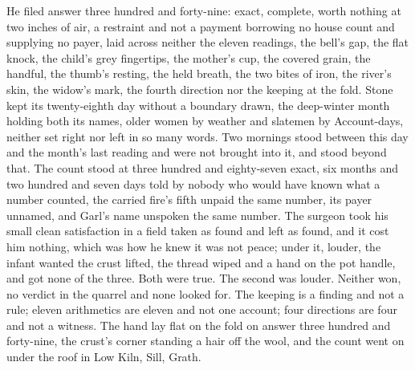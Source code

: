 He filed answer three hundred and forty-nine: exact, complete, worth nothing at two inches of air, a restraint and not a payment borrowing no house count and supplying no payer, laid across neither the eleven readings, the bell's gap, the flat knock, the child's grey fingertips, the mother's cup, the covered grain, the handful, the thumb's resting, the held breath, the two bites of iron, the river's skin, the widow's mark, the fourth direction nor the keeping at the fold. Stone kept its twenty-eighth day without a boundary drawn, the deep-winter month holding both its names, older women by weather and slatemen by  Account-days, neither set right nor left in so many words. Two mornings stood between this day and the month's last reading and were not brought into it, and  stood beyond that. The count stood at three hundred and eighty-seven exact, six months and two hundred and seven days told by nobody who would have known what a number counted, the carried fire's fifth unpaid the same number, its payer unnamed, and Garl's name unspoken the same number. The surgeon took his small clean satisfaction in a field taken as found and left as found, and it cost him nothing, which was how he knew it was not peace; under it, louder, the infant wanted the crust lifted, the thread wiped and a hand on the pot handle, and got none of the three. Both were true. The second was louder. Neither won, no verdict in the quarrel and none looked for. The keeping is a finding and not a rule; eleven arithmetics are eleven and not one account; four directions are four and not a witness. The hand lay flat on the fold on answer three hundred and forty-nine, the crust's corner standing a hair off the wool, and the count went on under the roof in Low Kiln, Sill, Grath.
